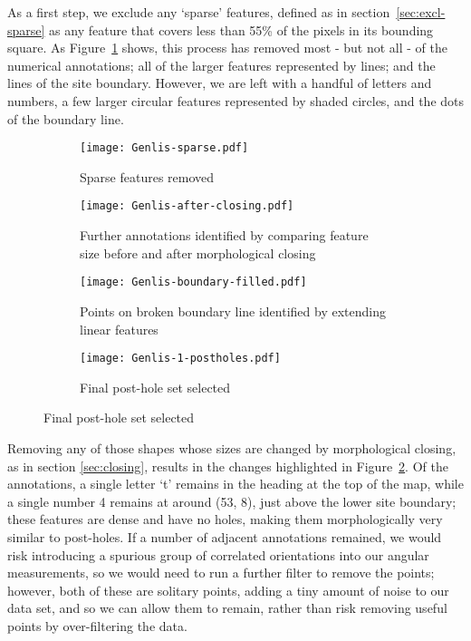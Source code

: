 \documentclass[../../ArchStats.tex]{subfiles}
\begin{document}
As a first step, we exclude any `sparse' features, defined as in section~\ref{sec:excl-sparse} as any feature that covers less than 55\% of the pixels in its bounding square. As Figure~\ref{fig:Genlis-f-ext-sparse-removed} shows, this process has removed most - but not all - of the numerical annotations; all of the larger features represented by lines; and the lines of the site boundary. However, we are left with a handful of letters and numbers, a few larger circular features represented by shaded circles, and the dots of the boundary line.

\begin{figure}[h!]
\centering
\caption{Stages of post-hole feature identification process for the Genlis site plan. After data cleaning, we are left with 243 post-holes.}
\label{fig:Genlis-f-ext}
%
\begin{subfigure}[b]{0.46\textwidth}
\caption{Sparse features removed}
\label{fig:Genlis-f-ext-sparse-removed}
\centering
\texttt{[image: Genlis-sparse.pdf]}
\end{subfigure}
%
\begin{subfigure}[b]{0.46\textwidth}
\caption{Further annotations identified by comparing feature size before and after morphological closing}
\label{fig:Genlis-f-ext-closed}
\centering
\texttt{[image: Genlis-after-closing.pdf]}
\end{subfigure}

\vspace{10pt}
%
\begin{subfigure}[b]{0.46\textwidth}
\caption{Points on broken boundary line identified by extending linear features}
\label{fig:Genlis-f-ext-boundary}
\centering
\texttt{[image: Genlis-boundary-filled.pdf]}
\end{subfigure}
%
\begin{subfigure}[b]{0.46\textwidth}
\caption{Final post-hole set selected}
\label{fig:Genlis-f-ext-postholes}
\centering
\texttt{[image: Genlis-1-postholes.pdf]}
\end{subfigure}
%
\end{figure}

Removing any of those shapes whose sizes are changed by morphological closing, as in section \ref{sec:closing}, results in the changes highlighted in Figure~\ref{fig:Genlis-f-ext-closed}. Of the annotations, a single letter `t' remains in the heading at the top of the map, while a single number 4 remains at around (53, 8), just above the lower site boundary; these features are dense and have no holes, making them morphologically very similar to post-holes. If a number of adjacent annotations remained, we would risk introducing a spurious group of correlated orientations into our angular measurements, so we would need to run a further filter to remove the points; however, both of these are solitary points, adding a tiny amount of noise to our data set, and so we can allow them to remain, rather than risk removing useful points by over-filtering the data.
\end{document}
